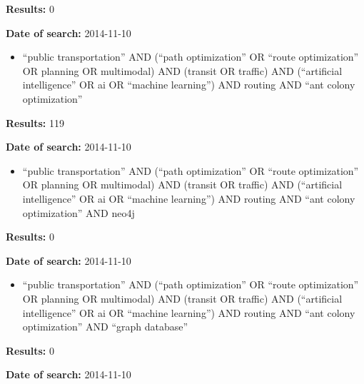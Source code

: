 \par \textbf{Results:} 0
\par \textbf{Date of search:} 2014-11-10
\begin{itemize}
	\item ``public transportation'' AND (``path optimization'' OR ``route optimization'' OR planning OR multimodal)  AND (transit OR traffic) AND (``artificial intelligence'' OR ai OR ``machine learning'') AND routing AND ``ant colony optimization''
\end{itemize}
\par \textbf{Results:} 119
\par \textbf{Date of search:} 2014-11-10
\begin{itemize}
	\item ``public transportation'' AND (``path optimization'' OR ``route optimization'' OR planning OR multimodal)  AND (transit OR traffic) AND (``artificial intelligence'' OR ai OR ``machine learning'') AND routing AND ``ant colony optimization'' AND neo4j
\end{itemize}
\par \textbf{Results:} 0
\par \textbf{Date of search:} 2014-11-10
\begin{itemize}
	\item ``public transportation'' AND (``path optimization'' OR ``route optimization'' OR planning OR multimodal)  AND (transit OR traffic) AND (``artificial intelligence'' OR ai OR ``machine learning'') AND routing AND ``ant colony optimization'' AND ``graph database''
\end{itemize}
\par \textbf{Results:} 0
\par \textbf{Date of search:} 2014-11-10





